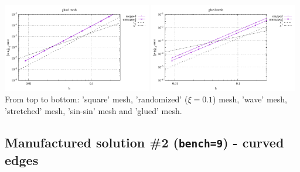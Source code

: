 \begin{center}
\includegraphics[width=6.5cm]{python_codes/fieldstone_76/results/bench9/straight/errors_V_mt6.pdf}
\includegraphics[width=6.5cm]{python_codes/fieldstone_76/results/bench9/straight/errors_P_mt6.pdf}\\
{\captionfont From top to bottom: 'square' mesh, 'randomized' ($\xi=0.1$) mesh,
'wave' mesh, 'stretched' mesh, 'sin-sin' mesh and 'glued' mesh.}
\end{center}

\newpage
\subsection*{Manufactured solution \#2 ({\tt bench=9}) - curved edges}

